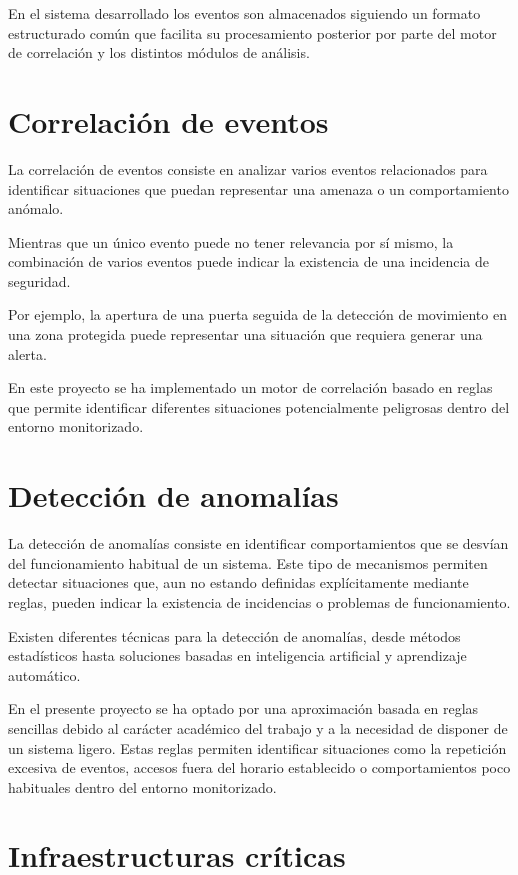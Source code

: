En el sistema desarrollado los eventos son almacenados siguiendo un formato estructurado común que facilita su procesamiento posterior por parte del motor de correlación y los distintos módulos de análisis.

\section{Correlación de eventos}

La correlación de eventos consiste en analizar varios eventos relacionados para identificar situaciones que puedan representar una amenaza o un comportamiento anómalo.

Mientras que un único evento puede no tener relevancia por sí mismo, la combinación de varios eventos puede indicar la existencia de una incidencia de seguridad.

Por ejemplo, la apertura de una puerta seguida de la detección de movimiento en una zona protegida puede representar una situación que requiera generar una alerta.

En este proyecto se ha implementado un motor de correlación basado en reglas que permite identificar diferentes situaciones potencialmente peligrosas dentro del entorno monitorizado.

\section{Detección de anomalías}

La detección de anomalías consiste en identificar comportamientos que se desvían del funcionamiento habitual de un sistema. Este tipo de mecanismos permiten detectar situaciones que, aun no estando definidas explícitamente mediante reglas, pueden indicar la existencia de incidencias o problemas de funcionamiento.

Existen diferentes técnicas para la detección de anomalías, desde métodos estadísticos hasta soluciones basadas en inteligencia artificial y aprendizaje automático.

En el presente proyecto se ha optado por una aproximación basada en reglas sencillas debido al carácter académico del trabajo y a la necesidad de disponer de un sistema ligero. Estas reglas permiten identificar situaciones como la repetición excesiva de eventos, accesos fuera del horario establecido o comportamientos poco habituales dentro del entorno monitorizado.

\section{Infraestructuras críticas}

